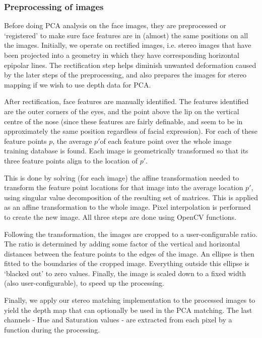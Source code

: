 \subsubsection{Preprocessing of images}
\label{sec:preprocess}

Before doing PCA analysis on the face images, they are preprocessed or `registered' to make sure
face features are in (almost) the same positions on all the images. Initially, we operate on rectified images, i.e. stereo images that have
been projected into a geometry in which they have corresponding horizontal epipolar lines. The
rectification step helps diminish unwanted deformation caused by the later steps of the
preprocessing, and also prepares the images for stereo mapping if we wish to use depth data for PCA.

After rectification, face features are manually identified. The features
identified are the outer corners of the eyes, and the point above the lip on the vertical centre of the nose
(since these features are fairly definable, and seem to be in approximately the same position regardless
of facial expression). For each of these feature points $p$, the average $p'$of each feature point over the whole image
training database is found. Each image is geometrically transformed so that its three feature points align to the location of $p'$.

This is done by solving (for each image) the affine transformation needed to transform the feature point
locations for that image into the average location $p'$, using singular value
decomposition of the resulting set of matrices. This is applied as an affine
transformation to the whole image. Pixel interpolation is performed to create the new image. All three steps are done using OpenCV functions.

Following the transformation, the images are cropped to a user-configurable
ratio. The ratio is determined by adding some factor of the vertical and horizontal distances
between the feature points to the edges of the image. An ellipse is then fitted to the boundaries of the cropped image. Everything outside this ellipse is
`blacked out' to zero values. Finally, the image is scaled down to a fixed width (also
user-configurable), to speed up the processing.

Finally, we apply our stereo matching implementation to the processed images to
yield the depth map that can optionally be used in the PCA matching. The last channels - Hue and Saturation values - are extracted from each pixel by a function during the processing.

